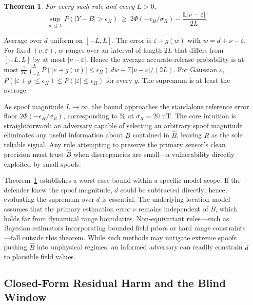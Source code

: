 \documentclass[conference]{IEEEtran}
\newcommand{\Bhat}{\widehat{B}}
\newtheorem{theorem}{Theorem}
\begin{document}
\begin{theorem}\label{thm:floor}
For every such rule and every $L>0$,
\begin{equation}
 \sup_{|d|\le L}P(|Y-B|>\epsilon_H)\ \ge\
 2\Phi(-\epsilon_H/\sigma_R)-\frac{\mathbb E|\nu-\varepsilon|}{2L}.
 \label{eq:floor}
\end{equation}
\end{theorem}
\begin{IEEEproof}
Average over $d$ uniform on $[-L,L]$. The error is $\varepsilon+g(w)$ with $w=d+\nu-\varepsilon$. For fixed $(\nu,\varepsilon)$, $w$ ranges over an interval of length $2L$ that differs from $[-L,L]$ by at most $|\nu-\varepsilon|$. Hence the average accurate-release probability is at most
$\frac1{2L}\int_{-L}^{L}P(|\varepsilon+g(w)|\le\epsilon_H)\,dw +\mathbb E|\nu-\varepsilon|/(2L)$. For Gaussian $\varepsilon$, $P(|\varepsilon+y|\le\epsilon_H)\le P(|\varepsilon|\le\epsilon_H)$ for every $y$. The supremum is at least the average.
\end{IEEEproof}

As spoof magnitude $L \to \infty$, the bound approaches the standalone reference error floor $2\Phi(-\epsilon_H/\sigma_R)$, corresponding to \TheoryFloorTwenty\% at $\sigma_R = 20\text{~nT}$. The core intuition is straightforward: an adversary capable of selecting an arbitrary spoof magnitude eliminates any useful information about $B$ contained in $\Bhat$, leaving $R$ as the sole reliable signal. Any rule attempting to preserve the primary sensor's clean precision must trust $\Bhat$ when discrepancies are small—a vulnerability directly exploited by small spoofs.

Theorem~\ref{thm:floor} establishes a worst-case bound within a specific model scope. If the defender knew the spoof magnitude, $d$ could be subtracted directly; hence, evaluating the supremum over $d$ is essential. The underlying location model assumes that the primary estimation error $\nu$ remains independent of $B$, which holds far from dynamical range boundaries. Non-equivariant rules—such as Bayesian estimators incorporating bounded field priors or hard range constraints—fall outside this theorem. While such methods may mitigate extreme spoofs pushing $\Bhat$ into unphysical regimes, an informed adversary can readily constrain $d$ to plausible field values.

\subsection{Closed-Form Residual Harm and the Blind Window}
\end{document}
